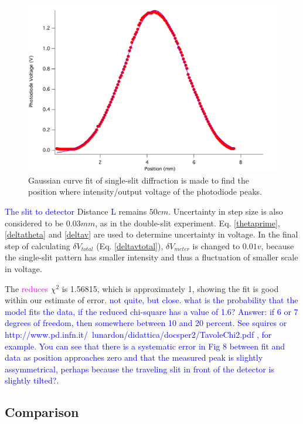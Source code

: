 \documentclass[prb,preprint]{revtex4-1}
\begin{document}
\begin{figure}[h]
\centering
\includegraphics[width=7in]{singlegaus.png}
\caption{Gaussian curve fit of single-slit diffraction is made to find the position where intensity/output voltage of the photodiode peaks.}
\label{gasfit2}
\end{figure}

\textcolor{blue}{The slit to detector} Distance \textcolor{blue}{L} remains $50 cm$. Uncertainty in step size is also considered to be $0.03mm$, as in the double-slit experiment. Eq. \ref{thetaprime}, \ref{deltatheta} and \ref{deltav} are used to determine uncertainty in voltage. In the final step of calculating $\delta V_{total}$ (Eq. \ref{deltavtotal}), $\delta V_{meter}$ is changed to $0.01v$, because the single-slit pattern has smaller intensity and thus a fluctuation of smaller scale in voltage.

The \textcolor{magenta}{reduces} $\chi^2$ is 1.56815, which is approximately 1, showing the fit is good within our estimate of error. \textcolor{blue}{not quite, but close. what is the probability that the model fits the data, if the reduced chi-square has a value of 1.6? Answer: if 6 or 7 degrees of freedom, then somewhere between 10 and 20 percent. See squires or http://www.pd.infn.it/~lunardon/didattica/docsper2/TavoleChi2.pdf , for example. You can see that there is a systematic error in Fig 8 between fit and data as position approaches zero and that the measured peak is slightly assymmetrical, perhaps because the traveling slit in front of the detector is slightly tilted?}. 

\subsection{Comparison}
\end{document}
